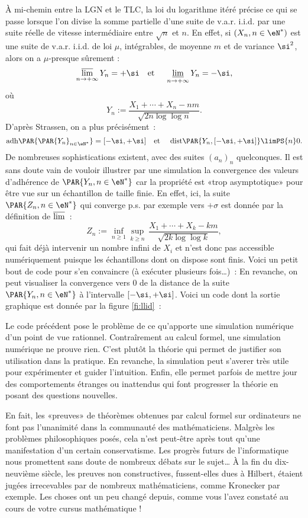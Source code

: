 À mi-chemin entre la LGN et le TLC, la loi du logarithme itéré précise ce qui
se passe lorsque l'on divise la somme partielle d'une suite de v.a.r. i.i.d.
par une suite réelle de vitesse intermédiaire entre $\sqrt{n}$ et $n$. En
effet, si $(X_n,n\in\eN^*)$ est une suite de v.a.r. i.i.d. de loi $\mu$,
intégrables, de moyenne $m$ et de variance $\si^2$, alors on a $\mu$-presque
sûrement :
$$
\varlimsup_{n\to+\infty} Y_n=+\si 
\text{\quad et \quad} 
\varliminf_{n\to+\infty} Y_n=-\si,
$$
où
$$
Y_n:=\frac{X_1+\cdots+X_n-nm}{\sqrt{2n\log\log n}}.
$$
D'après Strassen, on a plus précisément~:
$$
\mathrm{adh}\PAR{\PAR{Y_n}_{n\in\eN^*}}=[-\si,+\si]
\text{\quad et \quad}
\mathrm{dist}\PAR{Y_n,[-\si,+\si]}\limPS{n} 0.
$$
De nombreuses sophistications existent, avec des suites $(a_n)_n$
quelconques. Il est sans doute vain de vouloir illustrer par une simulation la
convergence des valeurs d'adhérence de $\PAR{Y_n,n\in\eN^*}$ car la propriété
est «trop asymptotique» pour être vue sur un échantillon de taille finie. En
effet, ici, la suite $\PAR{Z_n,n\in\eN^*}$ qui converge p.s. par exemple vers
$+\sigma$ est donnée par la définition de $\varlimsup$~:
$$
Z_n:=\inf_{n\geq 1}\sup_{k\geq n}\,\frac{X_1+\cdots+X_k-km}{\sqrt{2k\log\log k}},
$$
qui fait déjà intervenir un nombre infini de $X_i$ et n'est donc pas
accessible numériquement puisque les échantillons dont on dispose sont finis.
Voici un petit bout de code pour s'en convaincre (à exécuter plusieurs
fois\ldots)~:
%
%
En revanche, on peut visualiser la convergence vers $0$ de la distance de la
suite $\PAR{Y_n,n\in\eN^*}$ à l'intervalle $[-\si,+\si]$. Voici un code \ML{}
dont la sortie graphique est donnée par la figure \ref{fi:llid}~:
%
%
%
\begin{rem}
  Le code précédent pose le problème de ce qu'apporte une simulation numérique
  d'un point de vue rationnel. Contraîrement au calcul formel, une simulation
  numérique ne prouve rien. C'est plutôt la théorie qui permet de justifier
  son utilisation dans la pratique. En revanche, la simulation peut s'averer
  très utile pour expérimenter et guider l'intuition. Enfin, elle permet
  parfois de mettre jour des comportements étranges ou inattendus qui font
  progresser la théorie en posant des questions nouvelles.
  
  En fait, les «preuves» de théorèmes obtenues par calcul formel sur
  ordinateurs ne font pas l'unanimité dans la communauté des mathématiciens.
  Malgrès les problèmes philosophiques posés, cela n'est peut-être après tout
  qu'une manifestation d'un certain conservatisme. Les progrès futurs de
  l'informatique nous promettent sans doute de nombreux débats sur le
  sujet\ldots{} À la fin du dix-neuvième siècle, les preuves non
  constructives, fussent-elles dues à Hilbert, étaient jugées irrecevables par
  de nombreux mathématiciens, comme Kronecker par exemple. Les choses ont un
  peu changé depuis, comme vous l'avez constaté au cours de votre cursus
  mathématique !
\end{rem}


